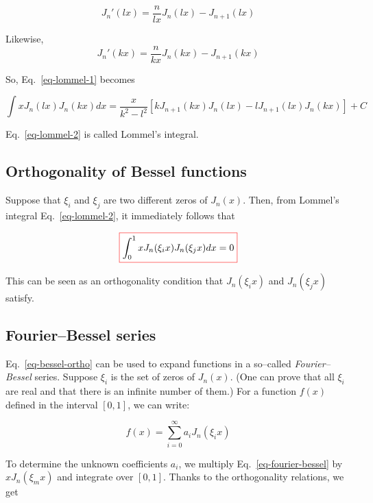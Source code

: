 \begin{equation}
J_n'(lx) =  \frac{n}{lx}J_n(lx)-J_{n+1}(lx)
\end{equation} 

Likewise,
\begin{equation}
J_n'(kx) =  \frac{n}{kx}J_n(kx)-J_{n+1}(kx)
\end{equation} 

So, Eq.~\ref{eq-lommel-1} becomes

\begin{equation}
\int x J_n(lx)J_n(kx)dx = \frac{x}{k^2 - l^2} \left[{k J_{n+1}(kx) J_n(lx) - l J_{n+1}(lx) J_n(kx)}\right] + C \label{eq-lommel-2}
\end{equation} 

Eq.~\ref{eq-lommel-2} is called Lommel's integral.

\subsection*{Orthogonality of Bessel functions}

Suppose that $\xi_i$ and $\xi_j$ are two different zeros of $J_n(x)$. Then, from Lommel's integral Eq.~\ref{eq-lommel-2}, it immediately follows that

\begin{equation}
\fbox{$\displaystyle
\int_0^1 x J_n(\xi_i x)J_n(\xi_j x)dx = 0 \label{eq-bessel-ortho}
$}
\end{equation} 

This can be seen as an orthogonality condition that $J_n(\xi_i x)$ and $J_n(\xi_j x)$ satisfy.

\subsection*{Fourier--Bessel series}

Eq.~\ref{eq-bessel-ortho} can be used to expand functions in a so--called \emph{Fourier--Bessel} series. Suppose $\xi_i$ is the set of zeros of $J_n(x)$. (One can prove that all $\xi_i$ are real and that there is an infinite number of them.) For a function $f(x)$ defined in the interval $[0,1]$, we can write:

\begin{equation}
f(x) = \sum_{i=0}^{\infty} a_i J_n(\xi_i x) \label{eq-fourier-bessel}
\end{equation} 

To determine the unknown coefficients $a_i$, we multiply Eq.~\ref{eq-fourier-bessel} by $x J_n(\xi_m x)$ and integrate over $[0,1]$. Thanks to the orthogonality relations, we get

